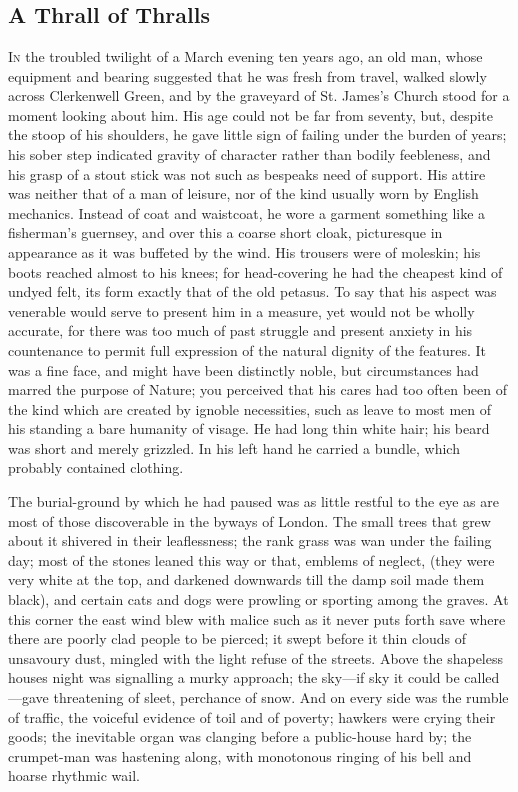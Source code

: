 \part{}

\chapter{A Thrall of Thralls}

\textsc{In} the troubled twilight of a March evening ten years ago, an
old man, whose equipment and bearing suggested that he was fresh from
travel, walked slowly across Clerkenwell Green, and by the graveyard of
St. James's Church stood for a moment looking about him. His age could
not be far from seventy, but, despite the stoop of his shoulders, he
gave little sign of failing under the burden of years; his sober step
indicated gravity of character rather than bodily feebleness, and his
grasp of a stout stick was not such as bespeaks need of support. His
attire was neither that of a man of leisure, nor of the kind usually
worn by English {}mechanics. Instead of coat and waistcoat, he wore a
garment something like a fisherman's guernsey, and over this a coarse
short cloak, picturesque in appearance as it was buffeted by the wind.
His trousers were of moleskin; his boots reached almost to his knees;
for head-covering he had the cheapest kind of undyed felt, its form
exactly that of the old petasus. To say that his aspect was venerable
would serve to present him in a measure, yet would not be wholly
accurate, for there was too much of past struggle and present anxiety in
his countenance to permit full expression of the natural dignity of the
features. It was a fine face, and might have been distinctly noble, but
circumstances had marred the purpose of Nature; you perceived that his
cares had too often been of the kind which are created by ignoble
necessities, such as leave to most men of his standing a bare humanity
of visage. He had long thin white hair; his beard was short and merely
grizzled. In his left hand he carried a bundle, which probably contained
clothing.

{}The burial-ground by which he had paused was as little restful to the
eye as are most of those discoverable in the byways of London. The small
trees that grew about it shivered in their leaflessness; the rank grass
was wan under the failing day; most of the stones leaned this way or
that, emblems of neglect, (they were very white at the top, and darkened
downwards till the damp soil made them black), and certain cats and dogs
were prowling or sporting among the graves. At this corner the east wind
blew with malice such as it never puts forth save where there are poorly
clad people to be pierced; it swept before it thin clouds of unsavoury
dust, mingled with the light refuse of the streets. Above the shapeless
houses night was signalling a murky approach; the sky---if sky it could
be called---gave threatening of sleet, perchance of snow. And on every
side was the rumble of traffic, the voiceful evidence of toil and of
poverty; hawkers were crying their goods; the inevitable organ was
clanging before a public-house hard by; {}the crumpet-man was hastening
along, with monotonous ringing of his bell and hoarse rhythmic wail.


